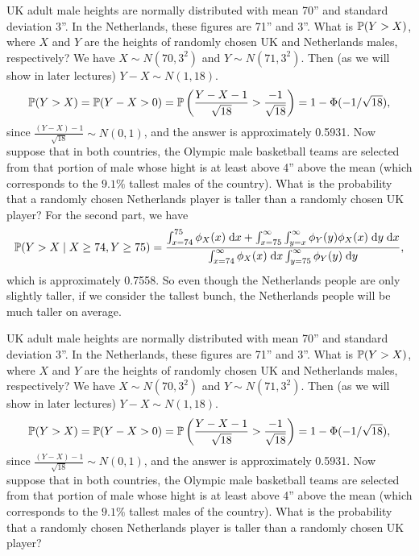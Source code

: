 \begin{note}
  \begin{field}
    \begin{eg}
      UK adult male heights are normally distributed with mean 70'' and standard deviation 3''. In the Netherlands, these figures are 71'' and 3''.
      What is $\P(Y > X)$, where $X$ and $Y$ are the heights of randomly chosen UK and Netherlands males, respectively?
      We have $X\sim N(70, 3^2)$ and $Y\sim N(71, 3^2)$. Then (as we will show in later lectures) $Y - X \sim N(1, 18)$.
      \[
        \P(Y > X) = \P(Y - X > 0) = \P\left(\frac{Y - X - 1}{\sqrt{18}} > \frac{-1}{\sqrt{18}}\right) = 1 - \Phi(-1/\sqrt{18}),
      \]
      since $\frac{(Y - X) - 1}{\sqrt{18}}\sim N(0, 1)$, and the answer is approximately 0.5931.
      Now suppose that in both countries, the Olympic male basketball teams are selected from that portion of male whose hight is at least above 4'' above the mean (which corresponds to the $9.1\%$ tallest males of the country). What is the probability that a randomly chosen Netherlands player is taller than a randomly chosen UK player?
      For the second part, we have
      \[
        \P(Y > X\mid X \geq 74, Y \geq 75) = \frac{\int_{x = 74}^{75} \phi_X(x)\;\d x + \int_{x = 75}^\infty \int_{y=x}^\infty \phi_Y(y)\phi_X(x)\;\d y\;\d x}{\int_{x=74}^\infty \phi_X(x)\;\d x \int_{y=75}^\infty \phi_Y(y)\;\d y},
      \]
      which is approximately 0.7558. So even though the Netherlands people are only slightly taller, if we consider the tallest bunch, the Netherlands people will be much taller on average.
    \end{eg}
  \end{field}
  \begin{field}
    \begin{eg}
      UK adult male heights are normally distributed with mean 70'' and standard deviation 3''. In the Netherlands, these figures are 71'' and 3''.
      What is $\P(Y > X)$, where $X$ and $Y$ are the heights of randomly chosen UK and Netherlands males, respectively?
      We have $X\sim N(70, 3^2)$ and $Y\sim N(71, 3^2)$. Then (as we will show in later lectures) $Y - X \sim N(1, 18)$.
      \[
        \P(Y > X) = \P(Y - X > 0) = \P\left(\frac{Y - X - 1}{\sqrt{18}} > \frac{-1}{\sqrt{18}}\right) = 1 - \Phi(-1/\sqrt{18}),
      \]
      since $\frac{(Y - X) - 1}{\sqrt{18}}\sim N(0, 1)$, and the answer is approximately 0.5931.
      Now suppose that in both countries, the Olympic male basketball teams are selected from that portion of male whose hight is at least above 4'' above the mean (which corresponds to the $9.1\%$ tallest males of the country). What is the probability that a randomly chosen Netherlands player is taller than a randomly chosen UK player?

\end{eg}
\end{field}
\end{note}
